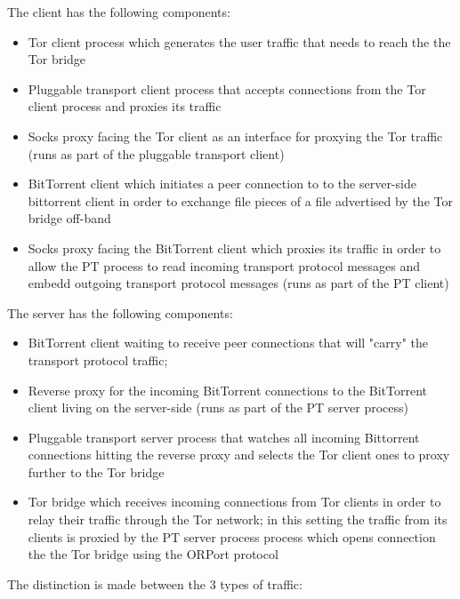 \documentclass[11pt]{article} %
\begin{document}
The client has the following components:

\begin{itemize}
\item Tor client process which generates the user traffic that needs to reach the the Tor bridge
\item Pluggable transport client process that accepts connections from the Tor client process and proxies its traffic
\item Socks proxy facing the Tor client as an interface for proxying the Tor traffic (runs as part of the pluggable transport client) 
\item BitTorrent client which initiates a peer connection to to the server-side bittorrent client in order to exchange file pieces of a file advertised by the Tor bridge off-band
\item Socks proxy facing the BitTorrent client which proxies its traffic in order to allow the PT process to read   incoming transport protocol messages and embedd outgoing transport protocol messages (runs as part of the PT client) 
\end{itemize}

The server has the following components:

\begin{itemize}

\item BitTorrent client waiting to receive peer connections that will "carry" the transport protocol traffic; 
\item Reverse proxy for the incoming BitTorrent connections to the BitTorrent client living on the server-side (runs as part of the PT server process)
\item Pluggable transport server process that watches all incoming Bittorrent connections hitting the reverse proxy and selects the Tor client ones to proxy further to the Tor bridge
\item Tor bridge which receives incoming connections from Tor clients in order to relay their traffic through the Tor network; in this setting the traffic from its clients is proxied by the PT server process process which opens connection the the Tor bridge using the ORPort protocol

\end{itemize}


The distinction is made between the 3 types of traffic:
\end{document}
